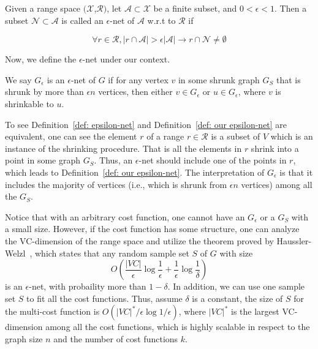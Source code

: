 \begin{definition}
\label{def: epsilon-net}
Given a range space $(\mathcal{X}$,$\mathcal{R})$, let $\mathcal{A} \subset \mathcal{X}$ be a finite subset, and $0<\epsilon<1$. Then a subset $\mathcal{N} \subset \mathcal{A}$ is called an $\epsilon$-net of $\mathcal{A}$ w.r.t to $\mathcal{R}$ if 

$$
\forall r \in \mathcal{R}, |r \cap \mathcal{A}|>\epsilon |\mathcal{A}| \rightarrow r\cap \mathcal{N} \neq \emptyset
$$
\end{definition}

Now, we define the $\epsilon$-net under our context. 

\begin{definition}
\label{def: our epsilon-net}
We say $G_\epsilon$ is an $\epsilon$-net of $G$ if for any vertex $v$ in some shrunk graph $G_S$ that is shrunk by more than $\epsilon n$ vertices, then either $v \in G_\epsilon$ or $u \in G_\epsilon$, where $v$ is shrinkable to $u$.    
\end{definition}

To see Definition~\ref{def: epsilon-net} and Definition~\ref{def: our epsilon-net} are equivalent, one can see the element $r$ of a range $r \in \mathcal{R}$ is a subset of $V$ which is an instance of the shrinking procedure. That is all the elements in $r$ shrink into a point in some graph $G_S$. Thus, an $\epsilon$-net should include one of the points in $r$, which leads to Definition~\ref{def: our epsilon-net}. The interpretation of $G_\epsilon$ is that it includes the majority of vertices (i.e., which is shrunk from $\epsilon n$ vertices) among all the $G_S$.

Notice that with an arbitrary cost function, one cannot have an $G_\epsilon$ or a $G_S$ with a small size. However, if the cost function has some structure, one can analyze the VC-dimension of the range space and utilize the theorem proved by Haussler-Welzl~\cite{haussler1986epsilon}, which states that any random sample set $S$ of $G$ with size 
\begin{equation}
\label{eq:Haussler-Welzl}
O(\frac{|VC|}{\epsilon} \log \frac{1}{\epsilon} + \frac{1}{\epsilon} \log \frac{1}{\delta})  
\end{equation}
is an $\epsilon$-net, with probaility more than $1-\delta$. In addition, we can use one sample set $S$ to fit all the cost functions. Thus, assume $\delta$ is a constant, the size of $S$ for the multi-cost function is $O(|VC|^*/\epsilon \log 1/\epsilon)$, where $|VC|^*$ is the largest VC-dimension among all the cost functions, which is highly scalable in respect to the graph size $n$ and the number of cost functions $k$.

